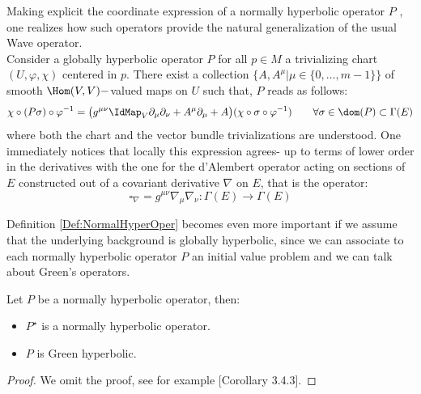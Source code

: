 \documentclass[Main]{subfiles}
\begin{document}
			Making explicit the coordinate expression of a normally hyperbolic operator $P$ , one realizes how such operators  provide the natural generalization of the usual Wave operator. 
			\\
			Consider a globally hyperbolic operator $P$ for all $p \in M$ a trivializing chart $(U, \varphi, \chi)$ centered in $p$. 
			There exist a collection $\big\{A, A^\mu \vert \mu\in \{0, \ldots ,m-1\}\big\}$ of smooth 
			$\Hom(V,V)-$valued maps on $U$ such that, $P$ reads as follows:
			\begin{equation}\label{Eq:NormallyHyperbolicRepresentation}
				\chi \circ ( P \sigma) \circ \varphi^{-1} =
				\big( g^{\mu \nu} \IdMap_V \partial_\mu \partial_\nu + A^\mu \partial_\mu + A\big)
				(\chi \circ \sigma \circ \varphi^{-1} ) 
				\qquad \forall \sigma \in \dom(P) \subset \Gamma(E)
			\end{equation}
		where both the chart and the vector bundle trivializations are understood. 
		One immediately notices that locally this expression agrees- up to terms of lower order in the derivatives with the one for the d'Alembert operator acting on sections of $E$  constructed out of a covariant derivative $\nabla$ on $E$, that is the operator:
		\begin{displaymath}
			\square_\nabla = g^{\mu \nu} \nabla_\mu \nabla_\nu : \Gamma(E) \rightarrow \Gamma(E)
		\end{displaymath}

		Definition \ref{Def:NormalHyperOper} becomes even more important if we assume that the underlying background is globally hyperbolic, since we can associate to each normally hyperbolic operator $P$ an initial value problem and we can talk about Green's operators.
		\begin{proposition}
			Let $P$ be a normally hyperbolic operator, then:
			\begin{itemize}
				\item	$P^\star$ is a normally hyperbolic operator.
				\item $P$ is Green hyperbolic.
			\end{itemize}
		\end{proposition}	
		\begin{proof}
			We omit the proof, see for example \cite{Baer2008}[Corollary 3.4.3].
		\end{proof}
		
\end{document}
